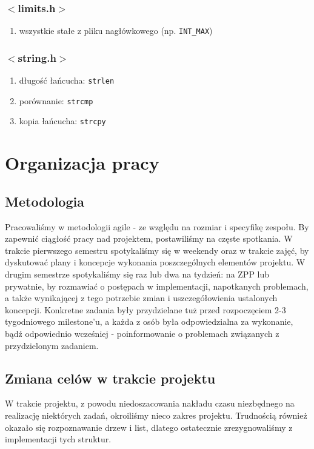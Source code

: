 \documentclass[a4paper,twoside,openright,11pt]{report}
\begin{document}
  \subsection {$<$limits.h$>$}
    \begin{enumerate}
      \item wszystkie stałe z pliku nagłówkowego (np. \texttt{INT\_MAX})
    \end{enumerate}
  \subsection {$<$string.h$>$}
    \begin{enumerate}
      \item długość łańcucha: \texttt{strlen}
      \item porównanie: \texttt{strcmp}
      \item kopia łańcucha: \texttt{strcpy}
    \end{enumerate}

  \chapter {Organizacja pracy}

  \section {Metodologia}
\par Pracowaliśmy w metodologii agile - ze względu na rozmiar i specyfikę zespołu. By zapewnić ciągłość pracy nad projektem, postawiliśmy na częste spotkania. W trakcie pierwszego semestru spotykaliśmy się w weekendy oraz w trakcie zajęć, by dyskutować plany i koncepcje wykonania poszczególnych elementów projektu. W drugim semestrze spotykaliśmy się raz lub dwa na tydzień: na ZPP lub prywatnie, by rozmawiać o postępach w implementacji, napotkanych problemach, a także wynikającej z tego potrzebie zmian i uszczegółowienia ustalonych koncepcji. Konkretne zadania były przydzielane tuż przed rozpoczęciem 2-3 tygodniowego milestone’u, a każda z osób była odpowiedzialna za wykonanie, bądź odpowiednio wcześniej - poinformowanie o problemach związanych z przydzielonym zadaniem.

  \section {Zmiana celów w trakcie projektu}
\par W trakcie projektu, z powodu niedoszacowania nakładu czasu niezbędnego na realizację niektórych zadań, okroiliśmy nieco zakres projektu. Trudnością również okazało się rozpoznawanie drzew i list, dlatego ostatecznie zrezygnowaliśmy z implementacji tych struktur.
\end{document}
